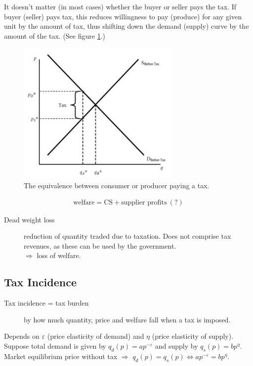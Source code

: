 \documentclass[12pt, a4paper, titlepage]{extarticle}
\begin{document}
	It doesn't matter (in most cases) whether the buyer or seller pays the tax. 
	If buyer (seller) pays tax, this reduces willingness to pay (produce) for any given unit by the amount of tax, thus shifting down the demand (supply) curve by the amount of the tax. 
	(See figure \ref{imgTaxation}.)
	\begin{figure}[h]
	\centering
		\includegraphics[width=8cm]{Taxation}
		\caption{The equivalence between consumer or producer paying a tax. \label{imgTaxation}}	
	\end{figure}
	\begin{equation}
		\begin{gathered}
			\text{welfare} = \text{CS} + \text{supplier profits}\ (?)
		\end{gathered}
	\end{equation}
	\begin{description}
		\item[Dead weight loss] reduction of quantity traded due to taxation. 
		Does not comprise tax revenues, as these can be used by the government.\\
		$\Rightarrow$ loss of welfare.
	\end{description}
	
	\subsection{Tax Incidence}
	\begin{description}
		\item[Tax incidence = tax burden] by how much quantity, price and welfare fall when a tax is imposed.  
	\end{description}
	Depends on $\varepsilon$ (price elasticity of demand) and $\eta$ (price elasticity of supply).\\
	Suppose total demand is given by $q_d(p) = ap^{-\varepsilon}$ and supply by $q_s(p) = bp^\eta$.\\
	Market equilibrium price without tax $\Rightarrow$ $q_d(p) = q_s(p) \Leftrightarrow ap^{-\varepsilon} = bp^\eta$.\\
	
\end{document}
